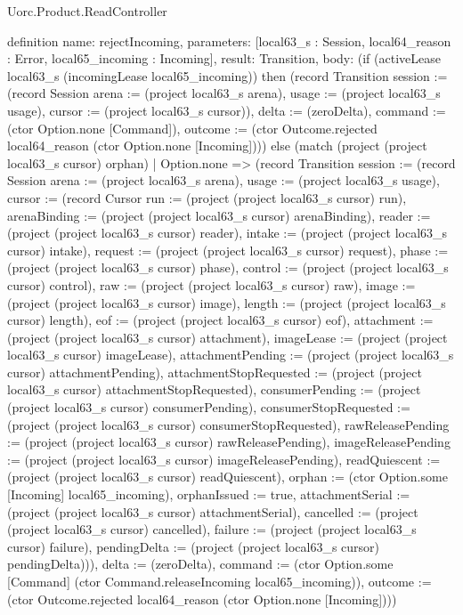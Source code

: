 \begin{lexlean}{Uorc.Product.ReadController}
\begin{semanticmodule}
definition{
  name: rejectIncoming,
  parameters: [local63_s : Session, local64_reason : Error, local65_incoming : Incoming],
  result: Transition,
  body: (if (activeLease local63_s (incomingLease local65_incoming)) then (record Transition {session := (record Session {arena := (project local63_s arena), usage := (project local63_s usage), cursor := (project local63_s cursor)}), delta := (zeroDelta), command := (ctor Option.none [Command]), outcome := (ctor Outcome.rejected local64_reason (ctor Option.none [Incoming]))}) else (match (project (project local63_s cursor) orphan)
    | Option.none => (record Transition {session := (record Session {arena := (project local63_s arena), usage := (project local63_s usage), cursor := (record Cursor {run := (project (project local63_s cursor) run), arenaBinding := (project (project local63_s cursor) arenaBinding), reader := (project (project local63_s cursor) reader), intake := (project (project local63_s cursor) intake), request := (project (project local63_s cursor) request), phase := (project (project local63_s cursor) phase), control := (project (project local63_s cursor) control), raw := (project (project local63_s cursor) raw), image := (project (project local63_s cursor) image), length := (project (project local63_s cursor) length), eof := (project (project local63_s cursor) eof), attachment := (project (project local63_s cursor) attachment), imageLease := (project (project local63_s cursor) imageLease), attachmentPending := (project (project local63_s cursor) attachmentPending), attachmentStopRequested := (project (project local63_s cursor) attachmentStopRequested), consumerPending := (project (project local63_s cursor) consumerPending), consumerStopRequested := (project (project local63_s cursor) consumerStopRequested), rawReleasePending := (project (project local63_s cursor) rawReleasePending), imageReleasePending := (project (project local63_s cursor) imageReleasePending), readQuiescent := (project (project local63_s cursor) readQuiescent), orphan := (ctor Option.some [Incoming] local65_incoming), orphanIssued := true, attachmentSerial := (project (project local63_s cursor) attachmentSerial), cancelled := (project (project local63_s cursor) cancelled), failure := (project (project local63_s cursor) failure), pendingDelta := (project (project local63_s cursor) pendingDelta)})}), delta := (zeroDelta), command := (ctor Option.some [Command] (ctor Command.releaseIncoming local65_incoming)), outcome := (ctor Outcome.rejected local64_reason (ctor Option.none [Incoming]))})
}
\end{semanticmodule}
\end{lexlean}
